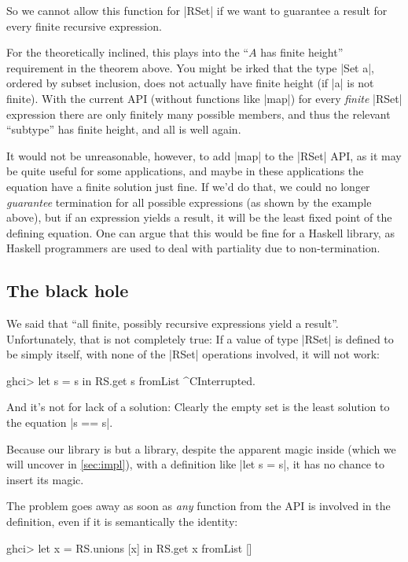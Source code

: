 \documentclass[manuscript,screen,acmsmall,nonacm]{acmart}
\begin{document}
So we cannot allow this function for |RSet| if we want to guarantee a result for every finite recursive expression.

For the theoretically inclined, this plays into the “$A$ has finite height” requirement in the theorem above. You might be irked that the type |Set a|, ordered by subset inclusion, does not actually have finite height (if |a| is not finite). With the current API (without functions like |map|) for every \emph{finite} |RSet| expression there are only finitely many possible members, and thus the relevant “subtype” has finite height, and all is well again.

It would not be unreasonable, however, to add |map| to the |RSet| API, as it may be quite useful for some applications, and maybe in these applications the equation have a finite solution just fine. If we'd do that, we could no longer \emph{guarantee} termination for all possible expressions (as shown by the example above), but if an expression yields a result, it will be the least fixed point of the defining equation. One can argue that this would be fine for a Haskell library, as Haskell programmers are used to deal with partiality due to non-termination.

\subsection{The black hole}\label{sec:blackhole}

We said that “all finite, possibly recursive expressions yield a result”. Unfortunately, that is not completely true: If a value of type |RSet| is defined to be simply itself, with none of the |RSet| operations involved, it will not work:
\begin{code}
ghci> let s = s in RS.get s
fromList ^CInterrupted.
\end{code}
And it’s not for lack of a solution: Clearly the empty set is the least solution to the equation |s == s|.

Because our library is but a library, despite the apparent magic inside (which we will uncover in \cref{sec:impl}), with a definition like |let s = s|, it has no chance to insert its magic.

The problem goes away as soon as \emph{any} function from the API is involved in the definition, even if it is semantically the identity:
\begin{code}
ghci> let x = RS.unions [x] in RS.get x
fromList []
\end{code}
\end{document}
